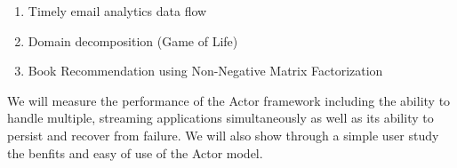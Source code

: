 \documentclass[11pt,letterpaper]{article}
\begin{document}
\begin{enumerate}
	\item Timely email analytics data flow
	\item Domain decomposition (Game of Life)
	\item Book Recommendation using Non-Negative Matrix Factorization
\end{enumerate}

We will measure the performance of the Actor framework including the ability to handle multiple, streaming applications simultaneously as well as its ability to persist and recover from failure. We will also show through a simple user study the benfits and easy of use of the Actor model. 



\end{document}
